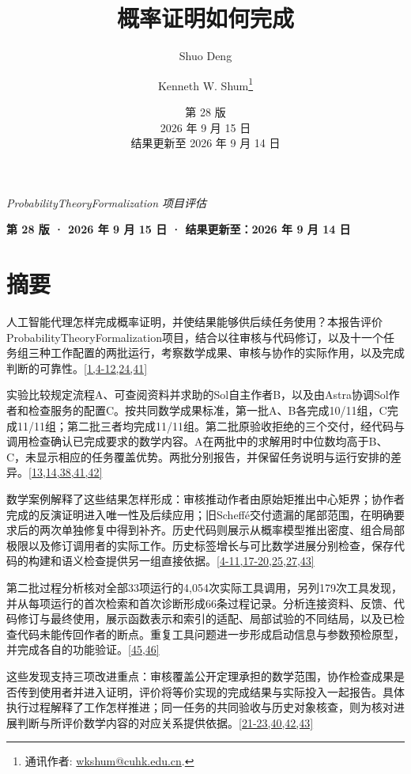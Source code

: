 
\title{概率证明如何完成}
\author{Shuo Deng \and Kenneth W. Shum\thanks{通讯作者: \href{mailto:wkshum@cuhk.edu.cn}{wkshum@cuhk.edu.cn}.}}\date{第 28 版\\2026 年 9 月 15 日\\结果更新至 2026 年 9 月 14 日}
\maketitle
\emph{ProbabilityTheoryFormalization 项目评估}

\textbf{第 28 版 · 2026 年 9 月 15 日 · 结果更新至：2026 年 9 月 14 日}

\section*{\texorpdfstring{\protect\hypertarget{abstract}{}摘要}{摘要}}
人工智能代理怎样完成概率证明，并使结果能够供后续任务使用？本报告评价ProbabilityTheoryFormalization项目，结合以往审核与代码修订，以及十一个任务组三种工作配置的两批运行，考察数学成果、审核与协作的实际作用，以及完成判断的可靠性。\hyperlink{ref-1}{\mbox{[1,4-12,24,41]}}

实验比较规定流程A、可查阅资料并求助的Sol自主作者B，以及由Astra协调Sol作者和检查服务的配置C。按共同数学成果标准，第一批A、B各完成10/11组，C完成11/11组；第二批三者均完成11/11组。第二批原验收拒绝的三个交付，经代码与调用检查确认已完成要求的数学内容。A在两批中的求解用时中位数均高于B、C，未显示相应的任务覆盖优势。两批分别报告，并保留任务说明与运行安排的差异。\hyperlink{ref-13}{\mbox{[13,14,38,41,42]}}

数学案例解释了这些结果怎样形成：审核推动作者由原始矩推出中心矩界；协作者完成的反演证明进入唯一性及后续应用；旧Scheffé交付遗漏的尾部范围，在明确要求后的两次单独修复中得到补齐。历史代码则展示从概率模型推出密度、组合局部极限以及修订调用者的实际工作。历史标签增长与可比数学进展分别检查，保存代码的构建和语义检查提供另一组直接依据。\hyperlink{ref-4}{\mbox{[4-11,17-20,25,27,43]}}

第二批过程分析核对全部33项运行的4,054次实际工具调用，另列179次工具发现，并从每项运行的首次检索和首次诊断形成66条过程记录。分析连接资料、反馈、代码修订与最终使用，展示函数表示和索引的适配、局部试验的不同结局，以及已检查代码未能传回作者的断点。重复工具问题进一步形成启动信息与参数预检原型，并完成各自的功能验证。\hyperlink{ref-45}{\mbox{[45,46]}}

这些发现支持三项改进重点：审核覆盖公开定理承担的数学范围，协作检查成果是否传到使用者并进入证明，评价将等价实现的完成结果与实际投入一起报告。具体执行过程解释了工作怎样推进；同一任务的共同验收与历史对象核查，则为核对进展判断与所评价数学内容的对应关系提供依据。\hyperlink{ref-21}{\mbox{[21-23,40,42,43]}}


